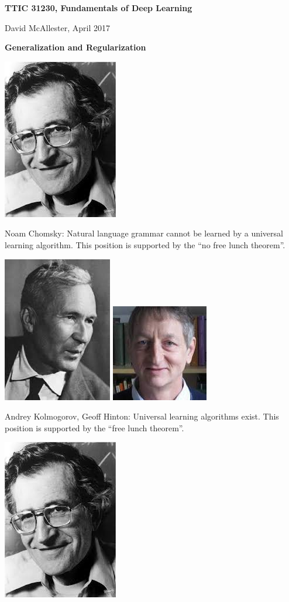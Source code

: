 





{\Huge


\centerline{\bf TTIC 31230, Fundamentals of Deep Learning}
\bigskip
\centerline{David McAllester, April 2017}

\vfill
\centerline{\bf Generalization and Regularization}
\vfill
\vfill


\includegraphics[width=1.0 in]{../images/Chomsky} \begin{minipage}[b]{8in} Noam Chomsky: 
Natural language grammar cannot be learned by a universal learning algorithm.
This position is supported by the ``no free lunch theorem''.\end{minipage}

\vfill
\includegraphics[height=1.0 in]{../images/Kolmogorov}
\includegraphics[height=1.0 in]{../images/Hinton}
\begin{minipage}[b]{7in}
Andrey Kolmogorov, Geoff Hinton: Universal learning algorithms exist. This position is supported by the ``free lunch theorem''.
\end{minipage}


\includegraphics[width=1.0 in]{../images/Chomsky} 

}
